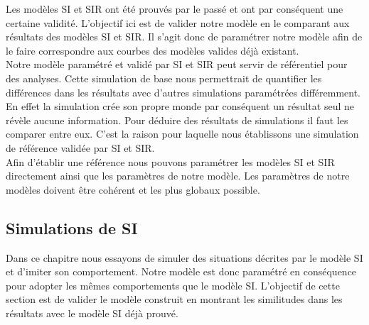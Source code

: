 Les modèles SI et SIR ont été prouvés par le passé et ont par conséquent une certaine validité. L'objectif ici est de valider notre modèle en le comparant aux résultats des modèles SI et SIR. Il s'agit donc de paramétrer notre modèle afin de le faire correspondre aux courbes des modèles valides déjà existant.\\

Notre modèle paramétré et validé par SI et SIR peut servir de référentiel pour des analyses. Cette simulation de base nous permettrait de quantifier les différences dans les résultats avec d'autres simulations paramétrées différemment. En effet la simulation crée son propre monde par conséquent un résultat seul ne révèle aucune information. Pour déduire des résultats de simulations il faut les comparer entre eux. C'est la raison pour laquelle nous établissons une simulation de référence validée par SI et SIR.\\

Afin d'établir une référence nous pouvons paramétrer les modèles SI et SIR directement ainsi que les paramètres de notre modèle. Les paramètres de notre modèles doivent être cohérent et les plus globaux possible.\\

\subsection{Simulations de SI}

Dans ce chapitre nous essayons de simuler des situations décrites par le modèle SI et d'imiter son comportement. Notre modèle est donc paramétré en conséquence pour adopter les mêmes comportements que le modèle SI. L'objectif de cette section est de valider le modèle construit en montrant les similitudes dans les résultats avec le modèle SI déjà prouvé. \\

